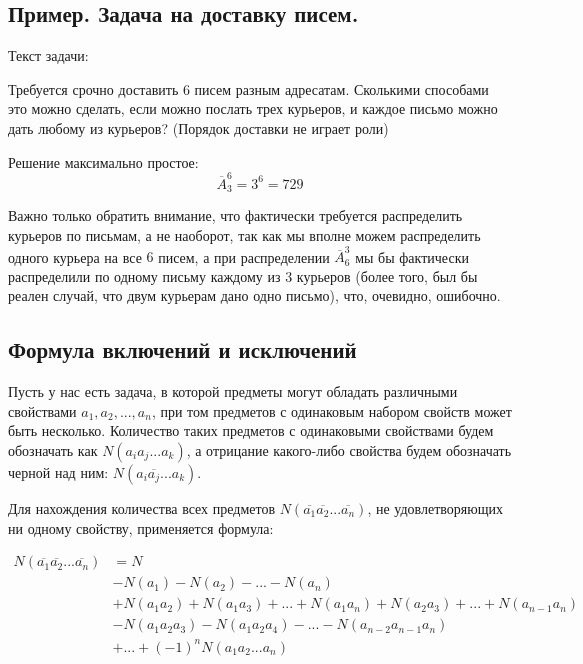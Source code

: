\documentclass{article}
\begin{document}
\subsection{Пример. Задача на доставку писем.}

Текст задачи:
\begin{displayquote}
Требуется срочно доставить 6 писем разным адресатам. Сколькими способами это можно сделать, если можно послать трех курьеров, и каждое письмо можно дать любому из курьеров? (Порядок доставки не играет роли)
\end{displayquote} 

Решение максимально простое: $$\overline{A}_3^6 = 3^6 = 729$$ 

Важно только обратить внимание, что фактически требуется распределить курьеров по письмам, а не наоборот, так как мы вполне можем распределить одного курьера на все $6$ писем, а при распределении $\overline{A}_6^3$ мы бы фактически распределили по одному письму каждому из $3$ курьеров (более того, был бы реален случай, что двум курьерам дано одно письмо), что, очевидно, ошибочно.

\subsection{Формула включений и исключений}

Пусть у нас есть задача, в которой предметы могут обладать различными свойствами $a_1, a_2, ..., a_n$, при том предметов с одинаковым набором свойств может быть несколько. Количество таких предметов с одинаковыми свойствами будем обозначать как $N(a_ia_j...a_k)$, а отрицание какого-либо свойства будем обозначать черной над ним: $N(a_i\overline{a_j}...a_k)$.

\begin{displayquote}
Для нахождения количества всех предметов $N(\overline{a_1}\overline{a_2}...\overline{a_n})$, не удовлетворяющих ни одному свойству, применяется формула:

\begin{align*}
N(\overline{a_1}\overline{a_2}...\overline{a_n}) &= N \\
    &- N(a_1) - N(a_2) - ... - N(a_n) \\
    &+ N(a_1a_2) + N(a_1a_3) + ... + N(a_1a_n) + N(a_2a_3) + ... + N(a_{n-1}a_n)  \\
    &- N(a_1a_2a_3) - N(a_1a_2a_4) - ... - N(a_{n-2}a_{n-1}a_n)  \\
    &+ ... + (-1)^nN(a_1a_2...a_n)
\end{align*}

\end{displayquote}
\end{document}
